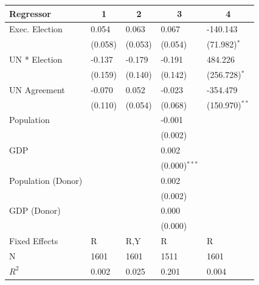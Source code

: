 %
\begin{tabular*}{\textwidth}{@{\extracolsep{\fill}}lllll}\hline\hline
\multicolumn{1}{l}{Regressor}&\multicolumn{1}{c}{1}&\multicolumn{1}{c}{2}&\multicolumn{1}{c}{3}&\multicolumn{1}{c}{4}\tabularnewline
\hline
Exec. Election&0.054&0.063&0.067&-140.143\tabularnewline
&{\scriptsize (0.058)$^{}$}&{\scriptsize (0.053)$^{}$}&{\scriptsize (0.054)$^{}$}&{\scriptsize (71.982)$^{*}$}\tabularnewline
UN * Election&-0.137&-0.179&-0.191&484.226\tabularnewline
&{\scriptsize (0.159)$^{}$}&{\scriptsize (0.140)$^{}$}&{\scriptsize (0.142)$^{}$}&{\scriptsize (256.728)$^{*}$}\tabularnewline
UN Agreement&-0.070&0.052&-0.023&-354.479\tabularnewline
&{\scriptsize (0.110)$^{}$}&{\scriptsize (0.054)$^{}$}&{\scriptsize (0.068)$^{}$}&{\scriptsize (150.970)$^{**}$}\tabularnewline
Population&&&-0.001&\tabularnewline
&&&{\scriptsize (0.002)$^{}$}&\tabularnewline
GDP&&&0.002&\tabularnewline
&&&{\scriptsize (0.000)$^{***}$}&\tabularnewline
Population (Donor)&&&0.002&\tabularnewline
&&&{\scriptsize (0.002)$^{}$}&\tabularnewline
GDP (Donor)&&&0.000&\tabularnewline
&&&{\scriptsize (0.000)$^{}$}&\tabularnewline
Fixed Effects&R&R,Y&R&R\tabularnewline
N&1601&1601&1511&1601\tabularnewline
$R^2$&0.002&0.025&0.201&0.004\tabularnewline
\hline
\end{tabular*}

